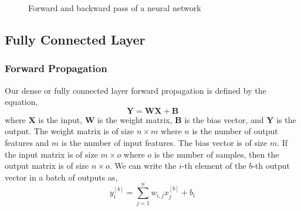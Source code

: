 \documentclass[11pt]{article}
\theoremstyle{definition}
\begin{document}
\begin{figure}[h]
    \centering
    \caption{Forward and backward pass of a neural network}
    \label{fig:forward_backward}
\end{figure}
\subsection{Fully Connected Layer}
\subsubsection{Forward Propagation}
Our dense or fully connected layer forward propagation is defined by the equation,
\begin{equation}
    \mathbf{Y} = \mathbf{W} \mathbf{X} + \mathbf{B}
\end{equation}
where $\mathbf{X}$ is the input, $\mathbf{W}$ is the weight matrix, $\mathbf{B}$ is the 
bias vector, and $\mathbf{Y}$ is the output. The weight matrix is of size $n \times m$ 
where $n$ is the number of output features and $m$ is the number of input features. 
The bias vector is of size $m$. If the input matrix is of size $m \times o$ where $o$ 
is the number of samples, then the output matrix is of size $n \times o$. 
We can write the $i$-th element of the $b$-th output vector in a batch of outputs as,
\begin{equation}
    y_i^{[b]} = \sum_{j=1}^{n} w_{i,j} x_j^{[b]} + b_i
    \label{eq:paticular_output}
\end{equation}
\end{document}
